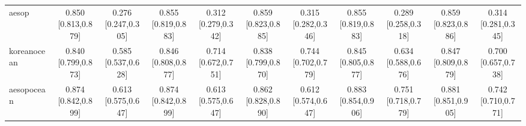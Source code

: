 \documentclass[10pt]{article}
\begin{document}
\begin{landscape}
\begin{longtable}{@{}l*{10}{c}@{}}
aesop & \shortstack{0.850\\{}[0.813,0.879]} & \shortstack{0.276\\{}[0.247,0.305]} & \shortstack{0.855\\{}[0.819,0.883]} & \shortstack{0.312\\{}[0.279,0.342]} & \shortstack{0.859\\{}[0.823,0.885]} & \shortstack{0.315\\{}[0.282,0.346]} & \shortstack{0.855\\{}[0.819,0.883]} & \shortstack{0.289\\{}[0.258,0.318]} & \shortstack{0.859\\{}[0.823,0.886]} & \shortstack{0.314\\{}[0.281,0.345]}\\
koreanocean & \shortstack{0.840\\{}[0.799,0.873]} & \shortstack{0.585\\{}[0.537,0.628]} & \shortstack{0.846\\{}[0.808,0.877]} & \shortstack{0.714\\{}[0.672,0.751]} & \shortstack{0.838\\{}[0.799,0.870]} & \shortstack{0.744\\{}[0.702,0.779]} & \shortstack{0.845\\{}[0.805,0.877]} & \shortstack{0.634\\{}[0.588,0.676]} & \shortstack{0.847\\{}[0.809,0.879]} & \shortstack{0.700\\{}[0.657,0.738]}\\
aesopocean & \shortstack{0.874\\{}[0.842,0.899]} & \shortstack{0.613\\{}[0.575,0.647]} & \shortstack{0.874\\{}[0.842,0.899]} & \shortstack{0.613\\{}[0.575,0.647]} & \shortstack{0.862\\{}[0.828,0.890]} & \shortstack{0.612\\{}[0.574,0.647]} & \shortstack{0.883\\{}[0.854,0.906]} & \shortstack{0.751\\{}[0.718,0.779]} & \shortstack{0.881\\{}[0.851,0.905]} & \shortstack{0.742\\{}[0.710,0.771]}\\

\end{longtable}
\end{landscape}
\end{document}

